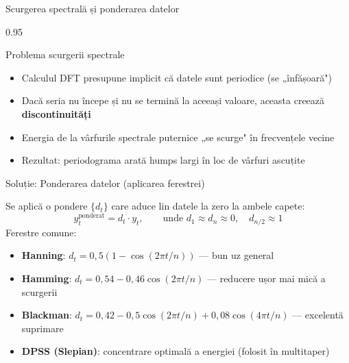 \documentclass[9pt, aspectratio=169, t]{beamer}
\begin{document}
\begin{frame}{Scurgerea spectrală și ponderarea datelor}
    \begin{cminipage}{0.95\textwidth}
    \vspace{-2mm}
    \begin{block}{Problema scurgerii spectrale}
        {\small
        \begin{itemize}\setlength{\itemsep}{0pt}
            \item Calculul DFT presupune implicit că datele sunt periodice (se „înfășoară")
            \item Dacă seria nu începe și nu se termină la aceeași valoare, aceasta creează \textbf{discontinuități}
            \item Energia de la vârfurile spectrale puternice „se scurge" în frecvențele vecine
            \item Rezultat: periodograma arată humps largi în loc de vârfuri ascuțite
        \end{itemize}
        }
    \end{block}
    \vspace{-2mm}
    \begin{exampleblock}{Soluție: Ponderarea datelor (aplicarea ferestrei)}
        {\small Se aplică o pondere $\{d_t\}$ care aduce lin datele la zero la ambele capete:
        \[
            y_t^{\text{ponderat}} = d_t \cdot y_t, \qquad \text{unde } d_1 \approx d_n \approx 0, \quad d_{n/2} \approx 1
        \]
        Ferestre comune:
        \begin{itemize}\setlength{\itemsep}{0pt}
            \item \textbf{Hanning}: $d_t = 0{,}5(1 - \cos(2\pi t / n))$ --- bun uz general
            \item \textbf{Hamming}: $d_t = 0{,}54 - 0{,}46\cos(2\pi t / n)$ --- reducere ușor mai mică a scurgerii
            \item \textbf{Blackman}: $d_t = 0{,}42 - 0{,}5\cos(2\pi t/n) + 0{,}08\cos(4\pi t/n)$ --- excelentă suprimare
            \item \textbf{DPSS (Slepian)}: concentrare optimală a energiei (folosit în multitaper)
        \end{itemize}}
    \end{exampleblock}
    \end{cminipage}
\end{frame}
\end{document}
